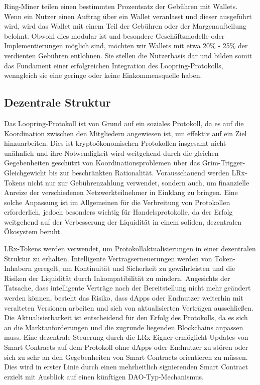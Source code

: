 \documentclass[UTF8,nofonts]{article}
\begin{document}
\begin{multicols}{2}
Ring-Miner teilen einen bestimmten Prozentsatz der Gebühren mit Wallets. Wenn ein Nutzer einen Auftrag über ein Wallet veranlasst und dieser ausgeführt wird, wird das Wallet mit einem Teil der Gebühren oder der Margenaufteilung belohnt. Obwohl dies modular ist und besondere Geschäftsmodelle oder Implementierungen möglich sind, möchten wir Wallets mit etwa 20\% - 25\% der verdienten Gebühren entlohnen. Sie stellen die Nutzerbasis dar und bilden somit das Fundament einer erfolgreichen Integration des Loopring-Protokolls, wenngleich sie eine geringe oder keine Einkommensquelle haben.

\subsection{Dezentrale Struktur}
Das Loopring-Protokoll ist von Grund auf ein soziales Protokoll, da es auf die Koordination zwischen den Mitgliedern angewiesen ist, um effektiv auf ein Ziel hinzuarbeiten. Dies ist kryptoökonomischen Protokollen insgesamt nicht unähnlich und ihre Notwendigkeit wird weitgehend durch die gleichen Gegebenheiten geschützt von Koordinationsproblemen \cite{vitalikgovernance} über das Grim-Trigger-Gleichgewicht bis zur beschränkten Rationalität. Vorausschauend werden LRx-Tokens nicht nur zur Gebührenzahlung verwendet, sondern auch, um finanzielle Anreize der verschiedenen Netzwerkteilnehmer in Einklang zu bringen. Eine solche Anpassung ist im Allgemeinen für die Verbreitung von Protokollen erforderlich, jedoch besonders wichtig für Handelsprotokolle, da der Erfolg weitgehend auf der Verbesserung der Liquidität in einem soliden, dezentralen Ökosystem beruht.

LRx-Tokens werden verwendet, um Protokollaktualisierungen in einer dezentralen Struktur zu erhalten. Intelligente Vertragserneuerungen werden von Token-Inhabern geregelt, um Kontinuität und Sicherheit zu gewährleisten und die Risiken der Liquidität durch Inkompatibilität zu mindern. Angesichts der Tatsache, dass intelligente Verträge nach der Bereitstellung nicht mehr geändert werden können, besteht das Risiko, dass dApps oder Endnutzer weiterhin mit veralteten Versionen arbeiten und sich von aktualisierten Verträgen ausschließen. Die Aktualisierbarkeit ist entscheidend für den Erfolg des Protokolls, da es sich an die Marktanforderungen und die zugrunde liegenden Blockchains anpassen muss. Eine dezentrale Steuerung durch die LRx-Eigner ermöglicht Updates von Smart Contracts auf dem Protokoll ohne dApps oder Endnutzer zu stören oder sich zu sehr an den Gegebenheiten von Smart Contracts orientieren zu müssen. Dies wird in erster Linie durch einen mehrheitlich signierenden Smart Contract erzielt mit Ausblick auf einen künftigen DAO-Typ-Mechanismus.


\end{multicols}
\end{document}
